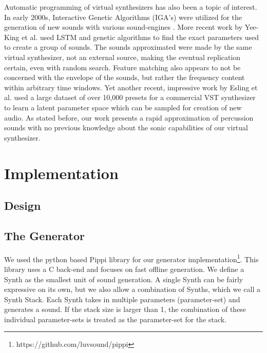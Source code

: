 \documentclass{nime-alternate} %
\begin{document}
Automatic programming of virtual synthesizers has also been a topic of interest. In early 2000s, Interactive Genetic Algorithms (IGA's) were utilized for the generation of new sounds with various sound-engines \cite{johnson1999exploring,dahlstedt2001creating}. More recent work by Yee-King et al. \cite{yee2018automatic} used LSTM and genetic algorithms to find the exact parameters used to create a group of sounds. The sounds approximated were made by the same virtual synthesizer, not an external source, making the eventual replication certain, even with random search. Feature matching also appears to not be concerned with the envelope of the sounds, but rather the frequency content within arbitrary time windows. Yet another recent, impressive work by Esling et al. used a large dataset of over 10,000 presets for a commercial VST synthesizer to learn a latent parameter space which can be sampled for creation of new audio. As stated before, our work presents a rapid approximation of percussion sounds with no previous knowledge about the sonic capabilities of our virtual synthesizer.
\section{Implementation}
\label{impl}
\subsection{Design}
 

\subsection{The Generator}
We used the python based Pippi library for our generator implementation\footnote{https://github.com/luvsound/pippi}. This library uses a C back-end and focuses on fast offline generation. We define a Synth as the smallest unit of sound generation. A single Synth can be fairly expressive on its own, but we also allow a combination of Synths, which we call a Synth Stack. Each Synth takes in multiple parameters (parameter-set) and generates a sound. If the stack size is larger than 1, the combination of these individual parameter-sets is treated as the parameter-set for the stack. 
\end{document}
